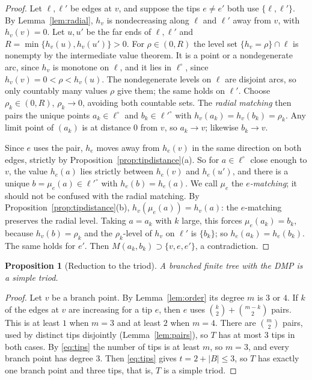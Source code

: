 \documentclass[11pt]{amsart}
\newtheorem{proposition}[theorem]{Proposition}
\theoremstyle{definition}
\theoremstyle{remark}
\newcommand{\M}{M}
\begin{document}
\begin{proof}
Let $\ell,\ell'$ be edges at $v$, and suppose the tips $e\ne e'$ both use $\{\ell,\ell'\}$. By Lemma~\ref{lem:radial}, $h_v$ is nondecreasing along $\ell$ and $\ell'$ away from $v$, with $h_v(v)=0$. Let $u,u'$ be the far ends of $\ell,\ell'$ and $R=\min\{h_v(u),h_v(u')\}>0$. For $\rho\in(0,R)$ the level set $\{h_v=\rho\}\cap\ell$ is nonempty by the intermediate value theorem. It is a point or a nondegenerate arc, since $h_v$ is monotone on $\ell$, and it lies in $\ell^\circ$, since $h_v(v)=0<\rho<h_v(u)$. The nondegenerate levels on $\ell$ are disjoint arcs, so only countably many values $\rho$ give them; the same holds on $\ell'$. Choose $\rho_k\in(0,R)$, $\rho_k\to0$, avoiding both countable sets. The \emph{radial matching} then pairs the unique points $a_k\in\ell^\circ$ and $b_k\in\ell'^\circ$ with $h_v(a_k)=h_v(b_k)=\rho_k$. Any limit point of $(a_k)$ is at distance $0$ from $v$, so $a_k\to v$; likewise $b_k\to v$.

Since $e$ uses the pair, $h_e$ moves away from $h_e(v)$ in the same direction on both edges, strictly by Proposition~\ref{prop:tipdistance}(a). So for $a\in\ell^\circ$ close enough to $v$, the value $h_e(a)$ lies strictly between $h_e(v)$ and $h_e(u')$, and there is a unique $b=\mu_e(a)\in\ell'^\circ$ with $h_e(b)=h_e(a)$. We call $\mu_e$ the \emph{$e$-matching}; it should not be confused with the radial matching. By Proposition~\ref{prop:tipdistance}(b), $h_v(\mu_e(a))=h_v(a)$: the $e$-matching preserves the radial level. Taking $a=a_k$ with $k$ large, this forces $\mu_e(a_k)=b_k$, because $h_v(b)=\rho_k$ and the $\rho_k$-level of $h_v$ on $\ell'$ is $\{b_k\}$; so $h_e(a_k)=h_e(b_k)$. The same holds for $e'$. Then $\M(a_k,b_k)\supset\{v,e,e'\}$, a contradiction.
\end{proof}

\begin{proposition}[Reduction to the triod]\label{prop:triod}
A branched finite tree with the DMP is a simple triod.
\end{proposition}
\begin{proof}
Let $v$ be a branch point. By Lemma~\ref{lem:order} its degree $m$ is $3$ or $4$. If $k$ of the edges at $v$ are increasing for a tip $e$, then $e$ uses $\binom k2+\binom{m-k}2$ pairs. This is at least $1$ when $m=3$ and at least $2$ when $m=4$. There are $\binom m2$ pairs, used by distinct tips disjointly (Lemma~\ref{lem:pairs}), so $T$ has at most $3$ tips in both cases. By \eqref{eq:tips} the number of tips is at least $m$, so $m=3$, and every branch point has degree $3$. Then \eqref{eq:tips} gives $t=2+|B|\le3$, so $T$ has exactly one branch point and three tips, that is, $T$ is a simple triod.
\end{proof}
\end{document}
